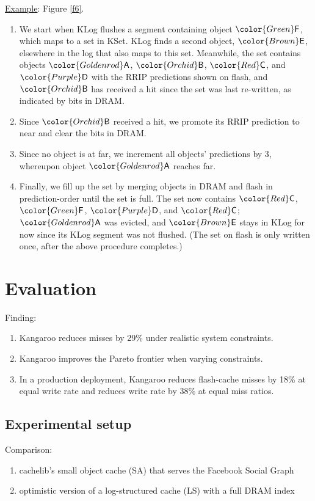 \documentclass[11pt]{article}
\newcommand{\mya}{\color{Goldenrod}\textsf{A}}
\newcommand{\myb}{\color{Orchid}\textsf{B}}
\newcommand{\myc}{\color{Red}\textsf{C}}
\newcommand{\myd}{\color{Purple}\textsf{D}}
\newcommand{\myf}{\color{Green}\textsf{F}}
\newcommand{\mye}{\color{Brown}\textsf{E}}
\begin{document}
\uline{Example}: Figure \ref{f6}.
\begin{enumerate}
\item We start when KLog flushes a segment containing object \(\color{Green}\textsf{F}\), which maps to a
set in KSet. KLog finds a second object, \(\color{Brown}\textsf{E}\), elsewhere in the log that
also maps to this set. Meanwhile, the set contains objects \(\mya\), \(\myb\), \(\myc\), and
\(\myd\) with the RRIP predictions shown on flash, and \(\myb\) has received a hit since the set
was last re-written, as indicated by bits in DRAM.
\item Since \(\myb\) received a hit, we promote its RRIP prediction to near and clear the bits in DRAM.
\item Since no object is at far, we increment all objects’ predictions by 3, whereupon object \(\mya\)
reaches far.
\item Finally, we fill up the set by merging objects in DRAM and flash in prediction-order until the set
is full. The set now contains \(\myc\), \(\myf\), \(\myd\), and \(\myc\); \(\mya\) was evicted, and
\(\mye\) stays in KLog for now since its KLog segment was not flushed. (The set on flash is only
written once, after the above procedure completes.)
\end{enumerate}
\section{Evaluation}
\label{sec:orgeacea34}
Finding:
\begin{enumerate}
\item Kangaroo reduces misses by 29\% under realistic system constraints.
\item Kangaroo improves the Pareto frontier when varying constraints.
\item In a production deployment, Kangaroo reduces flash-cache misses by 18\% at equal write rate and
reduces write rate by 38\% at equal miss ratios.
\end{enumerate}
\subsection{Experimental setup}
\label{sec:org5812a7b}
Comparison:
\begin{enumerate}
\item cachelib's small object cache (SA) that serves the Facebook Social Graph
\item optimistic version of a log-structured cache (LS) with a full DRAM index
\end{enumerate}
\end{document}
